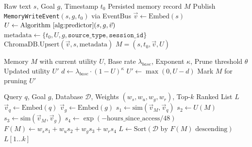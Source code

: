 \documentclass[conference]{IEEEtran}
\begin{document}
\begin{algorithm}[H]
\caption{Memory Writing Pipeline}
\label{alg:write}
\begin{algorithmic}[1]
\REQUIRE Raw text $s$, Goal $g$, Timestamp $t_0$
\ENSURE Persisted memory record $M$
\STATE Publish \texttt{MemoryWriteEvent}$(s, g, t_0)$ via EventBus
\STATE $\vec{v} \leftarrow \text{Embed}(s)$ 
\STATE $U \leftarrow \text{Algorithm~\ref{alg:predictor}}(s, g, \vec{v})$
\STATE $\text{metadata} \leftarrow \{t_0, U, g, \texttt{source\_type}, \texttt{session\_id}\}$
\STATE $\text{ChromaDB.Upsert}(\vec{v}, s, \text{metadata})$
\RETURN $M = (s, t_0, \vec{v}, U)$
\end{algorithmic}
\end{algorithm}

\begin{algorithm}[H]
\caption{Utility-Conditioned Decay}
\label{alg:decay}
\begin{algorithmic}[1]
\REQUIRE Memory $M$ with current utility $U$, Base rate $\lambda_{base}$, Exponent $\kappa$, Prune threshold $\theta$
\ENSURE Updated utility $U'$
\STATE $d \leftarrow \lambda_{base} \cdot (1 - U)^{\kappa}$
\STATE $U' \leftarrow \max(0, U - d)$
    \STATE Mark $M$ for pruning
\ENDIF
\RETURN $U'$
\end{algorithmic}
\end{algorithm}

\begin{algorithm}[H]
\caption{Four-Signal Retrieval}
\label{alg:retrieval}
\begin{algorithmic}[1]
\REQUIRE Query $q$, Goal $g$, Database $\mathcal{D}$, Weights $(w_s, w_u, w_g, w_r)$, Top-$k$
\ENSURE Ranked List $L$
\STATE $\vec{v}_q \leftarrow \text{Embed}(q)$
\STATE $\vec{v}_g \leftarrow \text{Embed}(g)$
    \STATE $s_1 \leftarrow \text{sim}(\vec{v}_M, \vec{v}_q)$ 
    \STATE $s_2 \leftarrow U(M)$ 
    \STATE $s_3 \leftarrow \text{sim}(\vec{v}_M, \vec{v}_g)$ 
    \STATE $s_4 \leftarrow \exp(-\text{hours\_since\_access}/48)$ 
    \STATE $F(M) \leftarrow w_s s_1 + w_u s_2 + w_g s_3 + w_r s_4$
\ENDFOR
\STATE $L \leftarrow \text{Sort}(\mathcal{D} \text{ by } F(M) \text{ descending})$
\RETURN $L[1 \dots k]$
\end{algorithmic}
\end{algorithm}
\end{document}
